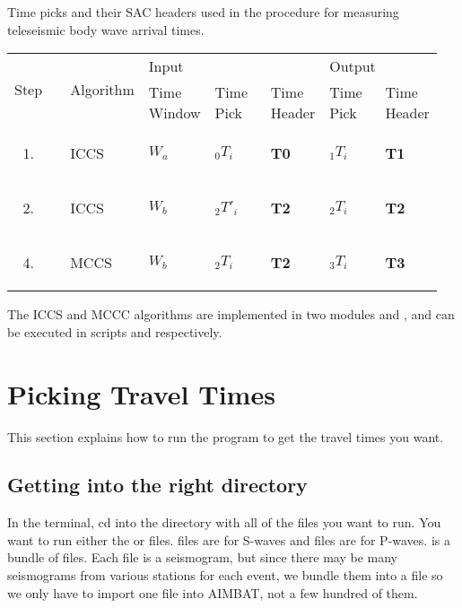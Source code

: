 \documentclass[letterpaper,10pt,english]{sphinxmanual}
\begin{document}
\begin{threeparttable}
\capstart\caption{Time picks and their SAC headers used in the procedure for measuring teleseismic body wave arrival times.}\label{docfiles/PickingTravelTimes:id2}
\begin{tabular}{|p{0.136\linewidth}|p{0.136\linewidth}|p{0.136\linewidth}|p{0.136\linewidth}|p{0.136\linewidth}|p{0.136\linewidth}|p{0.136\linewidth}|}
\hline
 \multirow{2}{*}{
Step
} &  \multirow{2}{*}{
Algorithm
} &  \multicolumn{3}{l|}{
Input
} &  \multicolumn{2}{l|}{
Output
}\\
\cline{3-7} &  & 
Time Window
 & 
Time Pick
 & 
Time Header
 & 
Time Pick
 & 
Time Header
\\
\hline\begin{enumerate}
\item {} 
\end{enumerate}
 & 
ICCS
 & 
\(W_a\)
 & 
\(_0T_i\)
 & 
\textbf{T0}
 & 
\(_1T_i\)
 & 
\textbf{T1}
\\
\hline\begin{enumerate}
\setcounter{enumi}{1}
\item {} 
\end{enumerate}
 & 
ICCS
 & 
\(W_b\)
 & 
\(_2T'_i\)
 & 
\textbf{T2}
 & 
\(_2T_i\)
 & 
\textbf{T2}
\\
\hline\begin{enumerate}
\setcounter{enumi}{3}
\item {} 
\end{enumerate}
 & 
MCCS
 & 
\(W_b\)
 & 
\(_2T_i\)
 & 
\textbf{T2}
 & 
\(_3T_i\)
 & 
\textbf{T3}
\\
\hline\end{tabular}

\end{threeparttable}


The ICCS and MCCC algorithms are implemented in two modules  and , and can be executed in scripts  and  respectively.


\section{Picking Travel Times}
\label{docfiles/PickingTravelTimes:picking-travel-times}
This section explains how to run the program  to get the travel times you want.


\subsection{Getting into the right directory}
\label{docfiles/PickingTravelTimes:getting-into-the-right-directory}
In the terminal, cd into the directory with all of the  files you want to run. You want to run either the  or  files.  files are for S-waves and  files are for P-waves.  is a bundle of  files. Each  file is a seismogram, but since there may be many seismograms from various stations for each event, we bundle them into a  file so we only have to import one file into AIMBAT, not a few hundred of them.
\end{document}
